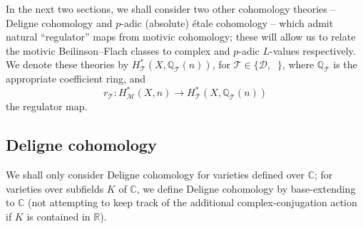 \documentclass[11pt, a4paper, reqno]{amsart}
\theoremstyle{definition}
\theoremstyle{plain}
\theoremstyle{remark}
\DeclareMathOperator{\et}{\acute{e}t}
\DeclareMathOperator{\syn}{syn}
\DeclareMathOperator{\mot}{\mathscr{M}}
\newcommand{\numberset}{\mathbb}
\newcommand{\C}{\numberset{C}}
\newcommand{\Q}{\numberset{Q}}
\newcommand{\R}{\numberset{R}}
\newcommand{\theory}{\mathcal{T}}
\newcommand{\del}{\mathcal{D}}
\newcommand{\regulator}[1]{r_{#1}}
\newcommand{\rD}{\regulator{\del}}
\newcommand{\ret}{\regulator{\et}}
\newcommand{\rsyn}{\regulator{\syn}}
\begin{document}
  In the next two sections, we shall consider two other cohomology theories -- Deligne cohomology and $p$-adic (absolute) \'etale cohomology -- which admit natural ``regulator'' maps from motivic cohomology; these will allow us to relate the motivic Beilinson--Flach classes to complex and $p$-adic $L$-values respectively. We denote these theories by $H^*_\theory(X, \Q_\theory(n))$, for $\theory \in \{ \del, \et\}$, where $\Q_\theory$ is the appropriate coefficient ring, and 
  \[ r_{\theory} : H^*_{\mot}(X, n) \to H^*_{\theory}(X, \Q_\theory(n)) \]
  the regulator map.
  

 \subsection{Deligne cohomology} We shall only consider Deligne cohomology for varieties defined over $\C$; for varieties over subfields $K$ of $\C$, we define Deligne cohomology by base-extending to $\C$ (not attempting to keep track of the additional complex-conjugation action if $K$ is contained in $\R$). 

  
\end{document}
